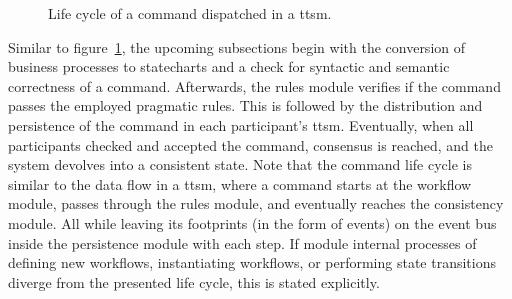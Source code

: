 \begin{figure}[h]
    \caption{Life cycle of a command dispatched in a \gls{ttsm}.}
    \label{fig:ttsm:proposal:command_life_cycle}
\end{figure}

Similar to figure~\ref{fig:ttsm:proposal:command_life_cycle}, the upcoming subsections begin with the conversion of business processes to statecharts and a check for syntactic and semantic correctness of a command. Afterwards, the rules module verifies if the command passes the employed pragmatic rules. This is followed by the distribution and persistence of the command in each participant's \gls{ttsm}. Eventually, when all participants checked and accepted the command, consensus is reached, and the system devolves into a consistent state. Note that the command life cycle is similar to the data flow in a \gls{ttsm}, where a command starts at the workflow module, passes through the rules module, and eventually reaches the consistency module. All while leaving its footprints (in the form of events) on the event bus inside the persistence module with each step. If module internal processes of defining new workflows, instantiating workflows, or performing state transitions diverge from the presented life cycle, this is stated explicitly.



